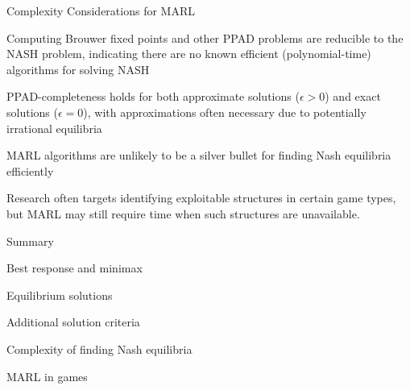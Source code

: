 \begin{frame}{Complexity Considerations for MARL}

\blist
    \item<1->  Computing Brouwer fixed points and other PPAD problems are reducible to the NASH problem, indicating there are no known efficient (polynomial-time) algorithms for solving NASH
    
    \item<2->  PPAD-completeness holds for both approximate solutions (\(\epsilon > 0\)) and exact solutions (\(\epsilon = 0\)), with approximations often necessary due to potentially irrational equilibria
    
    \item<3->  MARL algorithms are unlikely to be a silver bullet for finding Nash equilibria efficiently
    
    \item<4->  Research often targets identifying exploitable structures in certain game types, but MARL may still require  time when such structures are unavailable.
\elist
    
\end{frame}

\begin{frame}{Summary}

    \blist
        \item Best response and minimax
        \item Equilibrium solutions
        \item Additional solution criteria
        \item Complexity of finding Nash equilibria
    \elist


    \blist
        \item MARL in games
    \elist
    
\end{frame}



